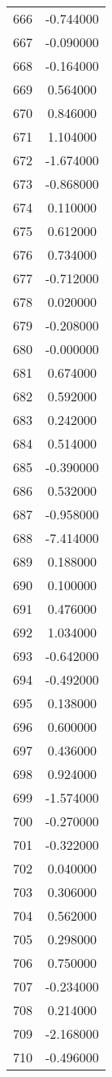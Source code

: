 \documentclass[12pt]{article}
\begin{document}
\begin{longtable}{@{}cc@{}}
666 & -0.744000 \\
667 & -0.090000 \\
668 & -0.164000 \\
669 & 0.564000 \\
670 & 0.846000 \\
671 & 1.104000 \\
672 & -1.674000 \\
673 & -0.868000 \\
674 & 0.110000 \\
675 & 0.612000 \\
676 & 0.734000 \\
677 & -0.712000 \\
678 & 0.020000 \\
679 & -0.208000 \\
680 & -0.000000 \\
681 & 0.674000 \\
682 & 0.592000 \\
683 & 0.242000 \\
684 & 0.514000 \\
685 & -0.390000 \\
686 & 0.532000 \\
687 & -0.958000 \\
688 & -7.414000 \\
689 & 0.188000 \\
690 & 0.100000 \\
691 & 0.476000 \\
692 & 1.034000 \\
693 & -0.642000 \\
694 & -0.492000 \\
695 & 0.138000 \\
696 & 0.600000 \\
697 & 0.436000 \\
698 & 0.924000 \\
699 & -1.574000 \\
700 & -0.270000 \\
701 & -0.322000 \\
702 & 0.040000 \\
703 & 0.306000 \\
704 & 0.562000 \\
705 & 0.298000 \\
706 & 0.750000 \\
707 & -0.234000 \\
708 & 0.214000 \\
709 & -2.168000 \\
710 & -0.496000 \\

\end{longtable}
\end{document}

